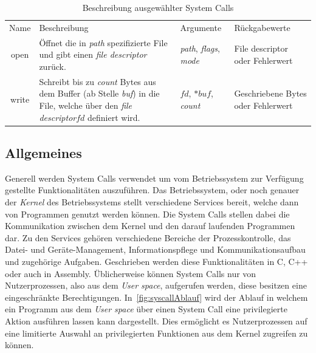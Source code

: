         \begin{table}[ht]
            \small
            \centering
            \begin{tabular}{cp{4cm}p{2cm}p{3cm}}
                \hline
                \rowcolor{Gray!36}
                \multicolumn{4}{c}{System Calls}\\
                \hline
                Name & Beschreibung & Argumente & Rückgabewerte\\
                \hline
                \hline
                \rowcolor{Gray!16}
                open& Öffnet die in \textit{path} spezifizierte File und gibt einen \textit{file descriptor} zurück.& \textit{path}, \textit{flags}, \textit{mode} & File descriptor oder Fehlerwert\\
                write& Schreibt bis zu \textit{count} Bytes aus dem Buffer (ab Stelle \textit{buf}) in die File, welche über den \textit{file descriptor}$fd$ definiert wird. & $fd$, $*buf$, \textit{count} & Geschriebene Bytes oder Fehlerwert\\
                \hline
            \end{tabular}
            \caption{Beschreibung ausgewählter System Calls}
            \label{tab:syscall}
        \end{table}

        \subsection{Allgemeines}

        Generell werden System Calls verwendet um vom Betriebssystem zur Verfügung gestellte Funktionalitäten auszuführen.
        Das Betriebssystem, oder noch genauer der \textit{Kernel}  des Betriebssystems stellt verschiedene Services bereit, welche dann von Programmen genutzt werden können. 
        Die System Calls stellen dabei die Kommunikation zwischen dem Kernel und den darauf laufenden Programmen dar.
        Zu den Services gehören verschiedene Bereiche der Prozesskontrolle, das Datei- und Geräte-Management, Informationspflege und Kommunikationsaufbau und zugehörige Aufgaben.
        Geschrieben werden diese Funktionalitäten in C, C++ oder auch in Assembly.
        Üblicherweise können System Calls nur von Nutzerprozessen, also aus dem \textit{User space}, aufgerufen werden, diese besitzen eine eingeschränkte Berechtigungen.
        In~\autoref{fig:syscallAblauf} wird der Ablauf in welchem ein Programm aus dem \textit{User space} über einen System Call eine privilegierte Aktion ausführen lassen kann dargestellt.
        Dies ermöglicht es Nutzerprozessen auf eine limitierte Auswahl an privilegierten Funktionen aus dem Kernel zugreifen zu können.~\cite{SYSCALL_SILBERSCHATZ}
    
